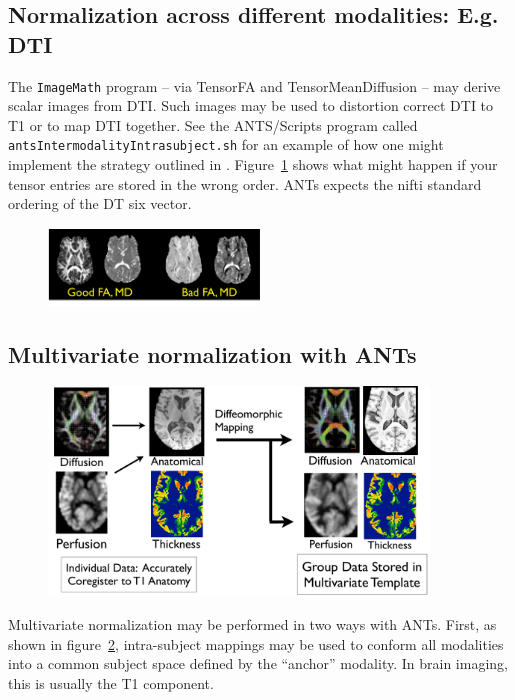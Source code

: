 \documentclass{InsightArticle}
\begin{document}
\subsection{Normalization across different modalities: E.g. DTI}
The \texttt{ImageMath} program -- via TensorFA and TensorMeanDiffusion -- 
may derive scalar images from DTI.  Such images may be used to 
distortion correct DTI to T1 or to map DTI together.   See the 
ANTS/Scripts program called \texttt{antsIntermodalityIntrasubject.sh}
for an example of how one might implement the strategy outlined in \cite{Tustison2014}.   Figure~\ref{fig:dterr} shows what might 
happen if your tensor entries are stored in the wrong order. 
ANTs expects the nifti standard ordering of the DT six vector.
\begin{figure}
\includegraphics[width=0.5\textwidth]{Figures/dtiordererr.pdf} 
\vspace{-0.1in}
\label{fig:dterr}
\end{figure}  
\subsection{Multivariate normalization with ANTs}
\begin{figure}
\includegraphics[width=0.9\textwidth]{Figures/multivariatenorm.pdf} 
\vspace{-0.1in}
\label{fig:mvnorm}
\end{figure}
Multivariate normalization may be performed in two ways with ANTs.  
First, as shown in figure~\ref{fig:mvnorm}, intra-subject mappings may 
be used to conform all modalities into a common subject space defined by 
the ``anchor'' modality.  In brain imaging, this is usually the T1 component.  
\end{document}
